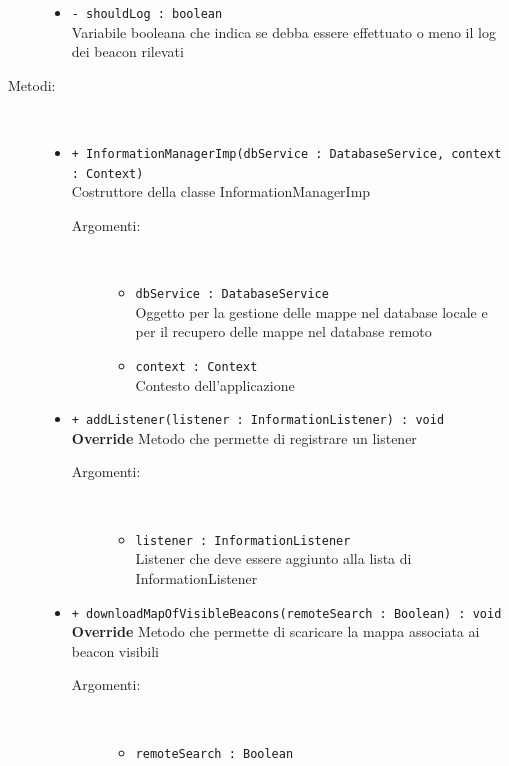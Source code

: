 \documentclass[../DefinizioneDiProdotto.tex]{subfiles}
\begin{document}
\begin{description}
\begin{itemize}
		\item \texttt{- shouldLog : boolean}\\
		Variabile booleana che indica se debba essere effettuato o meno il log dei beacon rilevati
		
	\end{itemize}
	\item[Metodi:] \
	\begin{itemize}
		\item \texttt{+ InformationManagerImp(dbService : DatabaseService, context : Context)}\\
		Costruttore della classe InformationManagerImp
		\begin{description}
			\item[Argomenti:] \
			\begin{itemize}
				\item \texttt{dbService : DatabaseService}\\
				Oggetto per la gestione delle mappe nel database locale e per il recupero delle mappe nel database remoto\item \texttt{context : Context}\\
				Contesto dell'applicazione\end{itemize}
		\end{description}
		\item \texttt{+ addListener(listener : InformationListener) : void}\\
		\textbf{Override} Metodo che permette di registrare un listener
		\begin{description}
			\item[Argomenti:] \
			\begin{itemize}
				\item \texttt{listener : InformationListener}\\
				Listener che deve essere aggiunto alla lista di InformationListener\end{itemize}
		\end{description}
		\item \texttt{+ downloadMapOfVisibleBeacons(remoteSearch : Boolean) : void}\\
		\textbf{Override} Metodo che permette di scaricare la mappa associata ai beacon visibili
		\begin{description}
			\item[Argomenti:] \
			\begin{itemize}
				\item \texttt{remoteSearch : Boolean}\\

\end{itemize}
\end{description}
\end{itemize}
\end{description}
\end{document}
